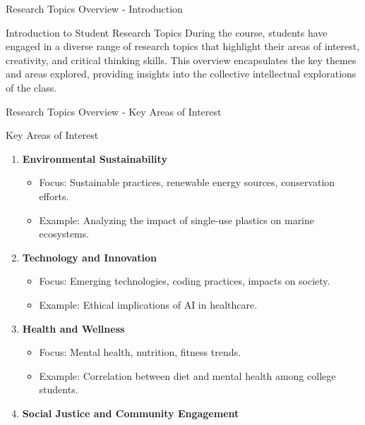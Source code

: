 \documentclass[aspectratio=169]{beamer}
\begin{document}
\begin{frame}[fragile]{Research Topics Overview - Introduction}
    \begin{block}{Introduction to Student Research Topics}
        During the course, students have engaged in a diverse range of research topics 
        that highlight their areas of interest, creativity, and critical thinking skills. 
        This overview encapsulates the key themes and areas explored, providing insights 
        into the collective intellectual explorations of the class.
    \end{block}
\end{frame}

\begin{frame}[fragile]{Research Topics Overview - Key Areas of Interest}
    \begin{block}{Key Areas of Interest}
        \begin{enumerate}
            \item \textbf{Environmental Sustainability}
                \begin{itemize}
                    \item Focus: Sustainable practices, renewable energy sources, conservation efforts.
                    \item Example: Analyzing the impact of single-use plastics on marine ecosystems.
                \end{itemize}
            \item \textbf{Technology and Innovation}
                \begin{itemize}
                    \item Focus: Emerging technologies, coding practices, impacts on society.
                    \item Example: Ethical implications of AI in healthcare.
                \end{itemize}
            \item \textbf{Health and Wellness}
                \begin{itemize}
                    \item Focus: Mental health, nutrition, fitness trends.
                    \item Example: Correlation between diet and mental health among college students.
                \end{itemize}
            \item \textbf{Social Justice and Community Engagement}
                \begin{itemize}

\end{itemize}
\end{enumerate}
\end{block}
\end{frame}
\end{document}
